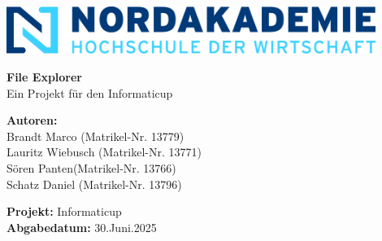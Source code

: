 \begin{titlepage}
	\begin{center}

		\includegraphics[width=0.9\textwidth]{images/Nordakademie_Logo.png}
		\vspace{1cm}

		\huge
		\textbf{File Explorer}\\
		Ein Projekt für den Informaticup
		\vspace{0.5cm}

		\large

		\vspace{1.5cm}
		\textbf{Autoren:}\\
		Brandt Marco (Matrikel-Nr. 13779)\\
		Lauritz Wiebusch (Matrikel-Nr. 13771)\\
		Sören Panten(Matrikel-Nr. 13766)\\
		Schatz Daniel (Matrikel-Nr. 13796)

		\vspace{1cm}
		\textbf{Projekt:} Informaticup\\
		\textbf{Abgabedatum:} 30.Juni.2025

		\vfill

	\end{center}

\end{titlepage}
